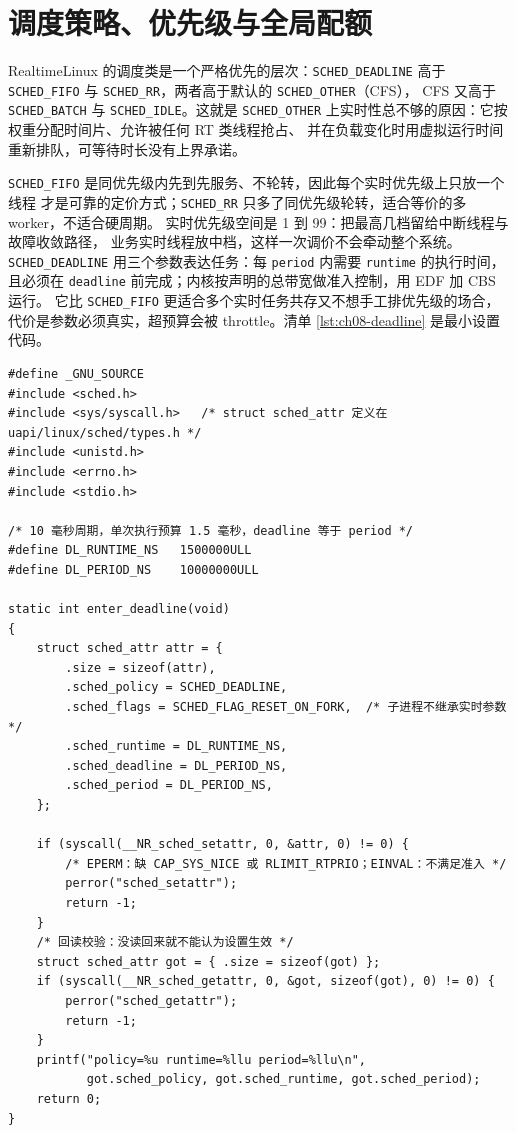 \documentclass[12pt,a4paper,fontset=fandol]{ctexbook}
\newcommand{\Tp}[1]{\texttt{#1}}
\newcommand{\Lang}[1]{\textsf{#1}}
\newcommand{\DomRT}{\Lang{Realtime}}
\begin{document}
\section{调度策略、优先级与全局配额}
\label{sec:ch08-sched}

\DomRT{}Linux 的调度类是一个严格优先的层次：\Tp{SCHED\_DEADLINE} 高于
\Tp{SCHED\_FIFO} 与 \Tp{SCHED\_RR}，两者高于默认的 \Tp{SCHED\_OTHER}（CFS），
CFS 又高于 \Tp{SCHED\_BATCH} 与 \Tp{SCHED\_IDLE}。这就是 \Tp{SCHED\_OTHER}
上实时性总不够的原因：它按权重分配时间片、允许被任何 RT 类线程抢占、
并在负载变化时用虚拟运行时间重新排队，可等待时长没有上界承诺。

\Tp{SCHED\_FIFO} 是同优先级内先到先服务、不轮转，因此每个实时优先级上只放一个线程
才是可靠的定价方式；\Tp{SCHED\_RR} 只多了同优先级轮转，适合等价的多 worker，不适合硬周期。
实时优先级空间是 1 到 99：把最高几档留给中断线程与故障收敛路径，
业务实时线程放中档，这样一次调价不会牵动整个系统。
\Tp{SCHED\_DEADLINE} 用三个参数表达任务：每 \Tp{period} 内需要 \Tp{runtime} 的执行时间，
且必须在 \Tp{deadline} 前完成；内核按声明的总带宽做准入控制，用 EDF 加 CBS 运行。
它比 \Tp{SCHED\_FIFO} 更适合多个实时任务共存又不想手工排优先级的场合，
代价是参数必须真实，超预算会被 throttle。清单 \ref{lst:ch08-deadline} 是最小设置代码。

\begin{lstlisting}[style=cstyle,caption={C：用 sched\_setattr 进入 SCHED\_DEADLINE 并回读校验},label={lst:ch08-deadline}]
#define _GNU_SOURCE
#include <sched.h>
#include <sys/syscall.h>   /* struct sched_attr 定义在 uapi/linux/sched/types.h */
#include <unistd.h>
#include <errno.h>
#include <stdio.h>

/* 10 毫秒周期，单次执行预算 1.5 毫秒，deadline 等于 period */
#define DL_RUNTIME_NS	1500000ULL
#define DL_PERIOD_NS	10000000ULL

static int enter_deadline(void)
{
	struct sched_attr attr = {
		.size = sizeof(attr),
		.sched_policy = SCHED_DEADLINE,
		.sched_flags = SCHED_FLAG_RESET_ON_FORK,  /* 子进程不继承实时参数 */
		.sched_runtime = DL_RUNTIME_NS,
		.sched_deadline = DL_PERIOD_NS,
		.sched_period = DL_PERIOD_NS,
	};

	if (syscall(__NR_sched_setattr, 0, &attr, 0) != 0) {
		/* EPERM：缺 CAP_SYS_NICE 或 RLIMIT_RTPRIO；EINVAL：不满足准入 */
		perror("sched_setattr");
		return -1;
	}
	/* 回读校验：没读回来就不能认为设置生效 */
	struct sched_attr got = { .size = sizeof(got) };
	if (syscall(__NR_sched_getattr, 0, &got, sizeof(got), 0) != 0) {
		perror("sched_getattr");
		return -1;
	}
	printf("policy=%u runtime=%llu period=%llu\n",
	       got.sched_policy, got.sched_runtime, got.sched_period);
	return 0;
}
\end{lstlisting}
\end{document}
